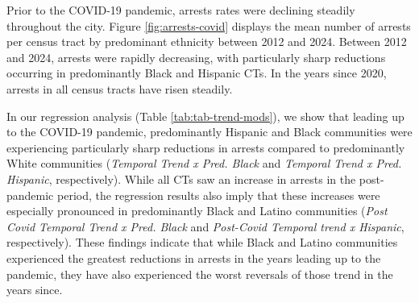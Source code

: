 \documentclass[
]{article}
\begin{document}
Prior to the COVID-19 pandemic, arrests rates were declining steadily
throughout the city. Figure \ref{fig:arrests-covid} displays the mean number of arrests per
census tract by predominant ethnicity between 2012 and 2024. Between
2012 and 2024, arrests were rapidly decreasing, with particularly sharp
reductions occurring in predominantly Black and Hispanic CTs. In the
years since 2020, arrests in all census tracts have risen steadily.

In our regression analysis (Table \ref{tab:tab-trend-mods}), we show that leading up to the
COVID-19 pandemic, predominantly Hispanic and Black communities were
experiencing particularly sharp reductions in arrests compared to
predominantly White communities (\emph{Temporal Trend x Pred. Black} and
\emph{Temporal Trend x Pred. Hispanic}, respectively). While all CTs saw
an increase in arrests in the post-pandemic period, the regression
results also imply that these increases were especially pronounced in
predominantly Black and Latino communities (\emph{Post Covid Temporal
Trend x Pred. Black} and \emph{Post-Covid Temporal trend x Hispanic},
respectively). These findings indicate that while Black and Latino
communities experienced the greatest reductions in arrests in the years
leading up to the pandemic, they have also experienced the worst
reversals of those trend in the years since.
\end{document}
